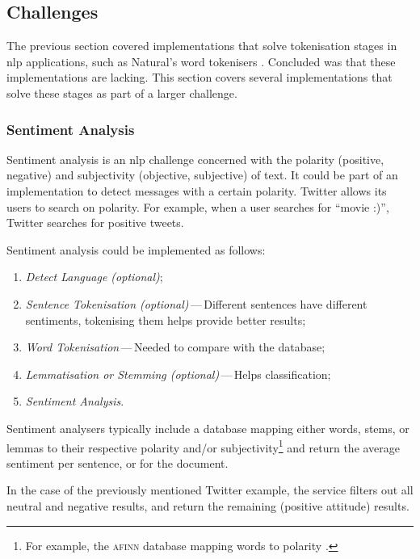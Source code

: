 \subsection{Challenges}\label{challenges}

The previous section covered implementations that solve tokenisation stages
  in \gls{nlp} applications, such as Natural's word
  tokenisers \autocite{NaturalNode/natural-source-code}.
Concluded was that these implementations are lacking.
This section covers several implementations that solve these stages
  as part of a larger challenge.

\subsubsection{Sentiment Analysis}\label{sentiment-analysis}

Sentiment analysis is an \gls{nlp} challenge concerned with the polarity
  (positive, negative) and subjectivity (objective, subjective) of text.
It could be part of an implementation to detect messages with a certain
  polarity.
Twitter allows its users to search on polarity.
For example, when a user searches for ``movie :)'', Twitter searches for
  positive tweets.

Sentiment analysis could be implemented as follows:

\begin{enumerate}
\item\emph{Detect Language (optional)};
\item\emph{Sentence Tokenisation (optional)}\,---\,Different sentences have
    different sentiments, tokenising them helps provide better results;
\item\emph{Word Tokenisation}\,---\,Needed to compare with the database;
\item\emph{Lemmatisation or Stemming (optional)}\,---\,Helps classification;
\item\emph{Sentiment Analysis}.
\end{enumerate}

\noindent Sentiment analysers typically include a
  database mapping either words, stems, or lemmas to their respective
  polarity and\slash or subjectivity\footnote{For example, the \textsc{afinn}
    database mapping words to polarity \autocite{nielsen-finn-arup-afinn}.}
  and return the average sentiment per sentence, or for the document.

In the case of the previously mentioned Twitter example, the service filters
  out all neutral and negative results, and return the remaining (positive
  attitude) results.

